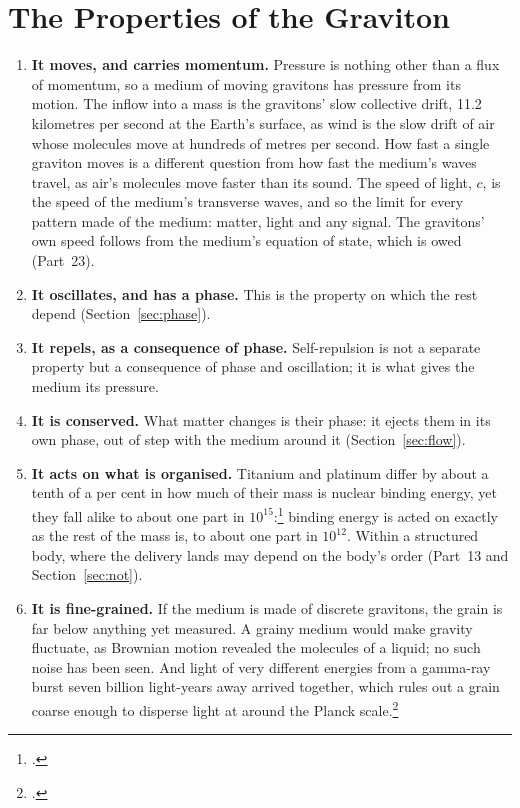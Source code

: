\documentclass[11pt,a4paper]{article}
\newcommand{\fn}[1]{\footnote{\citealp{#1}.}}
\begin{document}
\section{The Properties of the Graviton}
\label{sec:properties}

\begin{enumerate}
\item \textbf{It moves, and carries momentum.}  Pressure is nothing other than a flux of momentum, so a medium of moving gravitons has pressure from its motion. The inflow into a mass is the gravitons' slow collective drift, 11.2 kilometres per second at the Earth's surface, as wind is the slow drift of air whose molecules move at hundreds of metres per second. How fast a single graviton moves is a different question from how fast the medium's waves travel, as air's molecules move faster than its sound. The speed of light, $c$, is the speed of the medium's transverse waves, and so the limit for every pattern made of the medium: matter, light and any signal. The gravitons' own speed follows from the medium's equation of state, which is owed (Part~23).
\item \textbf{It oscillates, and has a phase.}  This is the property on which the rest depend (Section~\ref{sec:phase}).
\item \textbf{It repels, as a consequence of phase.}  Self-repulsion is not a separate property but a consequence of phase and oscillation; it is what gives the medium its pressure.
\item \textbf{It is conserved.}  What matter changes is their phase: it ejects them in its own phase, out of step with the medium around it (Section~\ref{sec:flow}).
\item \textbf{It acts on what is organised.}   Titanium and platinum differ by about a tenth of a per cent in how much of their mass is nuclear binding energy, yet they fall alike to about one part in $10^{15}$:\fn{touboul2022} binding energy is acted on exactly as the rest of the mass is, to about one part in $10^{12}$. Within a structured body, where the delivery lands may depend on the body's order (Part~13 and Section~\ref{sec:not}).
\item \textbf{It is fine-grained.} If the medium is made of discrete gravitons, the grain is far below anything yet measured. A grainy medium would make gravity fluctuate, as Brownian motion revealed the molecules of a liquid; no such noise has been seen. And light of very different energies from a gamma-ray burst seven billion light-years away arrived together, which rules out a grain coarse enough to disperse light at around the Planck scale.\fn{abdo2009}
\end{enumerate}
\end{document}
